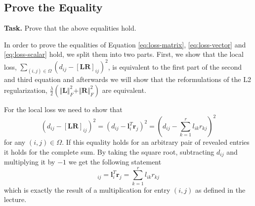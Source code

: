 \documentclass{support/acm_proc_article-sp}
\begin{document}
    \subsection{Prove the Equality}

    \textbf{Task.} Prove that the above equalities hold.

    In order to prove the equalities of Equation \ref{eq:loss-matrix}, \ref{eq:loss-vector} and
    \ref{eq:loss-scalar} hold, we split them into two parts.
    First, we show that the local loss, $\sum_{(i,j)\in\Omega}(d_{ij} - [\mathbf{LR}]_{ij})^2$,
    is equivalent to the first part of the second and third equation and afterwards we will show
    that the reformulations of the L2 regularization, $\frac{\lambda}{2}(\Vert \mathbf{L} \Vert_F^2 +
    \Vert \mathbf{R} \Vert_F^2)$ are equivalent.

    For the local loss we need to show that
    \begin{equation*}
        (d_{ij} - [\mathbf{LR}]_{ij})^2 =
        (d_{ij} - \mathbf{l}_i^T \mathbf{r}_j)^2 =
        \left(d_{ij} - \sum_{k=1}^r l_{ik}r_{kj} \right)^2
    \end{equation*}
    for any $(i,j)\in\Omega$.
    If this equality holds for an arbitrary pair of revealed entries it holds for the complete
    sum.
    By taking the square root, subtracting $d_{ij}$ and multiplying it by $-1$ we get the following statement
    \begin{equation*}
        [\mathbf{LR}]_{ij} =
        \mathbf{l}_i^T \mathbf{r}_j =
        \sum_{k=1}^r l_{ik}r_{kj}
    \end{equation*}
    which is exactly the result of a multiplication for entry $(i,j)$ as defined in the lecture.
\end{document}
